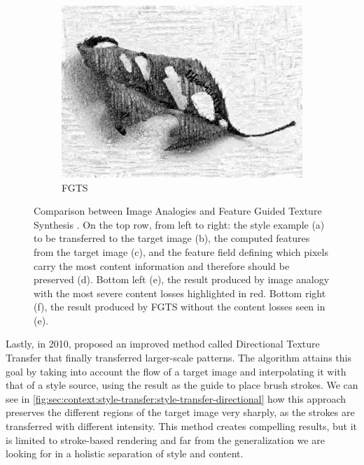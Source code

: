 \begin{figure}[htbp]
\begin{subfigure}[b]{0.5\textwidth}
    \includegraphics[width=\textwidth]{gfx/style-transfer-feature-6}
    \caption{FGTS}
  \end{subfigure}
  \caption{
    Comparison between Image Analogies and Feature Guided Texture Synthesis \cite{Xie2007}.
    On the top row, from left to right: the style example (a) to be transferred to the target image (b), the computed features from the target image (c), and the feature field defining which pixels carry the most content information and therefore should be preserved (d).
    Bottom left (e), the result produced by image analogy with the most severe content losses highlighted in red.
    Bottom right (f), the result produced by FGTS without the content losses seen in (e).
  }
  \label{fig:sec:context:style-transfer:style-transfer-feature}
\end{figure}

Lastly, in 2010, \citet{Lee2010} proposed an improved method called Directional Texture Transfer that finally transferred larger-scale patterns.
The algorithm attains this goal by taking into account the flow of a target image and interpolating it with that of a style source, using the result as the guide to place brush strokes.
We can see in \autoref{fig:sec:context:style-transfer:style-transfer-directional} how this approach preserves the different regions of the target image very sharply, as the strokes are transferred with different intensity.
This method creates compelling results, but it is limited to stroke-based rendering and far from the generalization we are looking for in a holistic separation of style and content.

